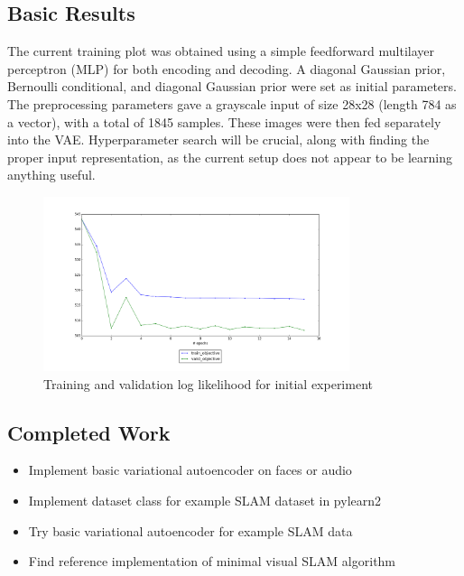 \documentclass{article}
\begin{document}
\subsection*{Basic Results}
The current training plot was obtained using a simple feedforward multilayer perceptron (MLP) for both
encoding and decoding. A diagonal Gaussian prior, Bernoulli conditional, and
diagonal Gaussian prior were set as initial parameters. The preprocessing
parameters gave a grayscale input of size 28x28 (length 784 as a vector), with
a total of 1845 samples. These images were then fed separately into the VAE.
Hyperparameter search will be crucial, along with finding the
proper input representation, as the current setup does not appear to be
learning anything useful.

\begin{figure}[h!]
    \centering
    \includegraphics[width=0.8\textwidth,height=0.6\textwidth]{vae_basic_enlarged.png}
    \caption{Training and validation log likelihood for initial experiment}
\end{figure}


\subsection*{Completed Work}
\begin{itemize}
    \item Implement basic variational autoencoder on faces or audio
    \item Implement dataset class for example SLAM dataset in pylearn2
    \item Try basic variational autoencoder for example SLAM data 
    \item Find reference implementation of minimal visual SLAM algorithm
\end{itemize}
\end{document}
